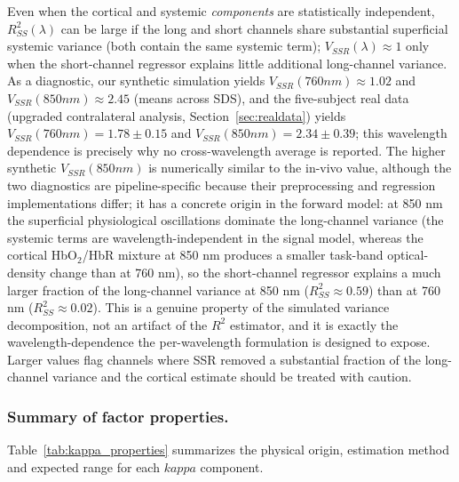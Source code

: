 \documentclass[11pt]{article}
\def\kappa{kappa}%
\def\mathrm#1{#1}%
\def\,{ }%
\begin{document}
Even when the cortical and systemic \emph{components} are statistically independent, $R^2_{\mathrm{SS}}(\lambda)$ can be large if the long and short channels share substantial superficial systemic variance (both contain the same systemic term); $V_{\mathrm{SSR}}(\lambda) \approx 1$ only when the short-channel regressor explains little additional long-channel variance. As a diagnostic, our synthetic simulation yields $V_{\mathrm{SSR}}(760\,\mathrm{nm}) \approx 1.02$ and $V_{\mathrm{SSR}}(850\,\mathrm{nm}) \approx 2.45$ (means across SDS), and the five-subject real data (upgraded contralateral analysis, Section~\ref{sec:realdata}) yields $V_{\mathrm{SSR}}(760\,\mathrm{nm}) = 1.78 \pm 0.15$ and $V_{\mathrm{SSR}}(850\,\mathrm{nm}) = 2.34 \pm 0.39$; this wavelength dependence is precisely why no cross-wavelength average is reported. The higher synthetic $V_{\mathrm{SSR}}(850\,\mathrm{nm})$ is numerically similar to the in-vivo value, although the two diagnostics are pipeline-specific because their preprocessing and regression implementations differ; it has a concrete origin in the forward model: at 850\,nm the superficial physiological oscillations dominate the long-channel variance (the systemic terms are wavelength-independent in the signal model, whereas the cortical HbO$_2$/HbR mixture at 850\,nm produces a smaller task-band optical-density change than at 760\,nm), so the short-channel regressor explains a much larger fraction of the long-channel variance at 850\,nm ($R^2_{\mathrm{SS}} \approx 0.59$) than at 760\,nm ($R^2_{\mathrm{SS}} \approx 0.02$). This is a genuine property of the simulated variance decomposition, not an artifact of the $R^2$ estimator, and it is exactly the wavelength-dependence the per-wavelength formulation is designed to expose. Larger values flag channels where SSR removed a substantial fraction of the long-channel variance and the cortical estimate should be treated with caution.

\subsubsection{Summary of factor properties.}

Table~\ref{tab:kappa_properties} summarizes the physical origin, estimation method and expected range for each $\kappa$ component.
\end{document}
